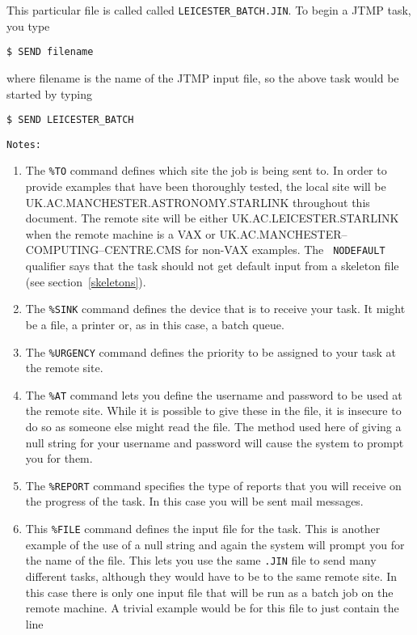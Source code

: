 This particular file is called called {\tt LEICESTER\_BATCH.JIN}. To begin a
JTMP task, you type

\begin{verbatim}
$ SEND filename
\end{verbatim}

where filename is the name of the JTMP input file, so the above task would be
started by typing

\begin{verbatim}
$ SEND LEICESTER_BATCH
\end{verbatim}

{\tt Notes:}

\begin{enumerate}

\item The {\tt \%TO} command defines which site the job is being sent to. In
order to provide examples that have been thoroughly tested, the local site will
be UK.AC.MANCHESTER.ASTRONOMY.STARLINK throughout this document. The remote site
will be either UK.AC.LEICESTER.STARLINK when the remote machine is a VAX or
UK.AC.MANCHESTER--COMPUTING--CENTRE.CMS for non-VAX examples. The {\tt
NODEFAULT} qualifier says that the task should not get default input from a
skeleton file (see section~\ref{skeletons}).

\item The {\tt \%SINK} command defines the device that is to receive your task.
It might be  a file, a printer or, as in this case, a batch queue.

\item The {\tt \%URGENCY} command defines the priority to be assigned to your
task at the remote site.

\item The {\tt \%AT} command lets you define the username and password to be
used at the remote site. While it is possible to give these in the file, it is
insecure to do so as someone else might read the file. The method used here of
giving a null string for your username and password will cause the system to
prompt you for them.

\item The {\tt \%REPORT} command specifies the type of reports that you will
receive on the progress of the task. In this case you will be sent mail
messages.

\item This {\tt \%FILE} command defines the input file for the task. This is
another example of the use of a null string and again the system will prompt
you for the name of the file. This lets you use the same {\tt .JIN} file to
send many different tasks, although they would have to be to the same remote
site. In this case there is only one input file that will be run as a batch job
on the remote machine. A trivial example would be for this file to just contain
the line


\end{enumerate}
